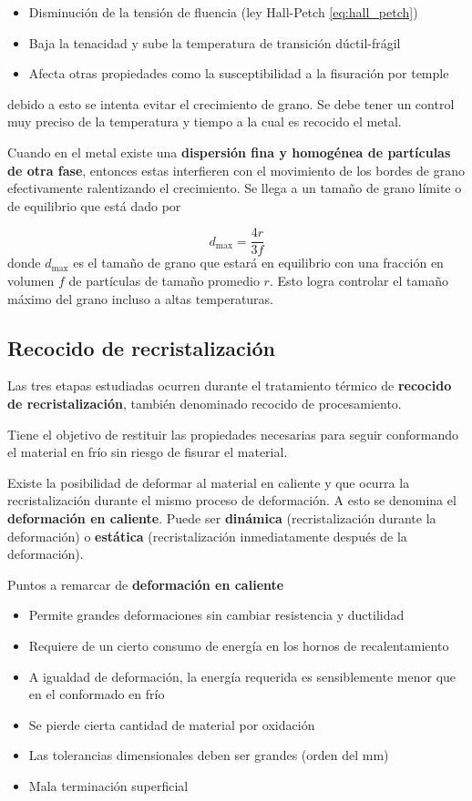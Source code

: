 \begin{itemize}
	\item Disminución de la tensión de fluencia (ley Hall-Petch \eqref{eq:hall_petch})
	\item Baja la tenacidad y sube la temperatura de transición dúctil-frágil
	\item Afecta otras propiedades como la susceptibilidad a la fisuración por temple
\end{itemize}
debido a esto se intenta evitar el crecimiento de grano. Se debe tener un control muy preciso de la temperatura y tiempo a la cual es recocido el metal.

Cuando en el metal existe una \textbf{dispersión fina y homogénea de partículas de otra fase}, entonces estas interfieren con el movimiento de los bordes de grano efectivamente ralentizando el crecimiento. Se llega a un tamaño de grano límite o de equilibrio que está dado por 

\begin{equation}
	d_{\max} = \frac{4 r}{3 f}
\end{equation}
donde $d_{\max}$ es el tamaño de grano que estará en equilibrio con una fracción en volumen $f$ de partículas de tamaño promedio $r$. Esto logra controlar el tamaño máximo del grano incluso a altas temperaturas.


\subsection{Recocido de recristalización}

Las tres etapas estudiadas ocurren durante el tratamiento térmico de \textbf{recocido de recristalización}, también denominado recocido de procesamiento.

Tiene el objetivo de restituir las propiedades necesarias para seguir conformando el material en frío sin riesgo de fisurar el material.

Existe la posibilidad de deformar al material en caliente y que ocurra la recristalización durante el mismo proceso de deformación. A esto se denomina el \textbf{deformación en caliente}. Puede ser \textbf{dinámica} (recristalización durante la deformación) o \textbf{estática} (recristalización inmediatamente después de la deformación).

Puntos a remarcar de \textbf{deformación en caliente}
\begin{itemize}
	\item Permite grandes deformaciones sin cambiar resistencia y ductilidad
	\item Requiere de un cierto consumo de energía en los hornos de recalentamiento
	\item A igualdad de deformación, la energía requerida es sensiblemente menor que en el conformado en frío
	\item Se pierde cierta cantidad de material por oxidación
	\item Las tolerancias dimensionales deben ser grandes (orden del mm)
	\item Mala terminación superficial
\end{itemize}

